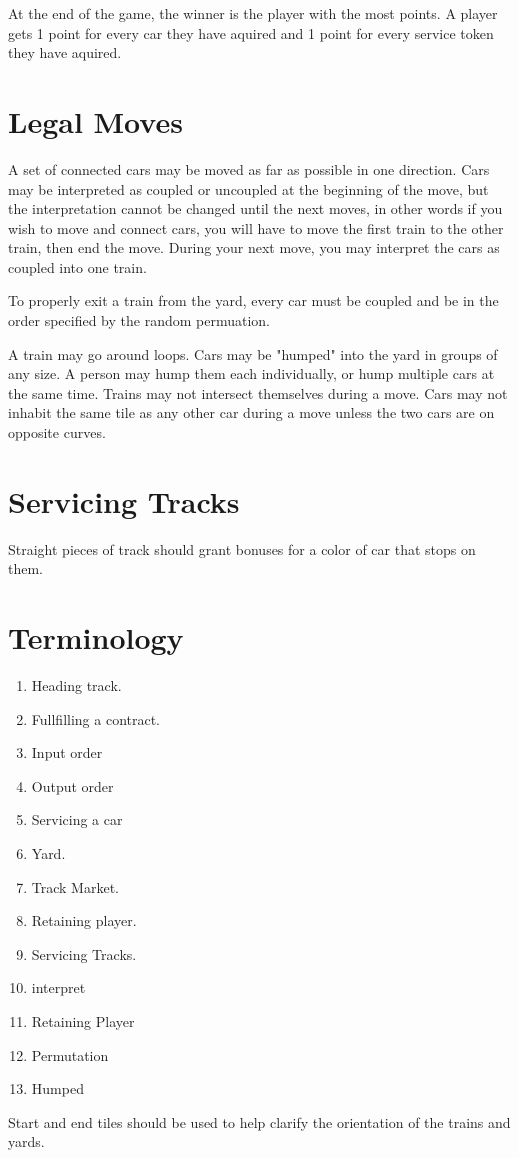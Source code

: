 \documentclass[12pt, letterpaper]{article}
\begin{document}
At the end of the game, the winner is the player with the most points. A player gets 1 point for every car they have aquired and 1 point for every service token they have aquired.

\section{Legal Moves}

A set of connected cars may be moved as far as possible in one direction. Cars may be interpreted as coupled or uncoupled at the beginning of the move, but the interpretation cannot be changed until the next moves, in other words if you wish to move and connect cars, you will have to move the first train to the other train, then end the move. During your next move, you may interpret the cars as coupled into one train.

To properly exit a train from the yard, every car must be coupled and be in the order specified by the random permuation.

A train may go around loops. Cars may be "humped" into the yard in groups of any size.
A person may hump them each individually, or hump multiple cars at the same time.
Trains may not intersect themselves during a move.
Cars may not inhabit the same tile as any other car during a move unless the two cars are on opposite curves.

\section{Servicing Tracks}

Straight pieces of track should grant bonuses for a color of car that stops on them.

\section{Terminology}

\begin{enumerate}
\item Heading track.
\item Fullfilling a contract.
\item Input order
\item Output order
\item Servicing a car
\item Yard.
\item Track Market.
\item Retaining player.
\item Servicing Tracks.
\item interpret
\item Retaining Player
\item Permutation
\item Humped
\end{enumerate}

Start and end tiles should be used to help clarify the orientation of the trains and yards.

\end{document}
